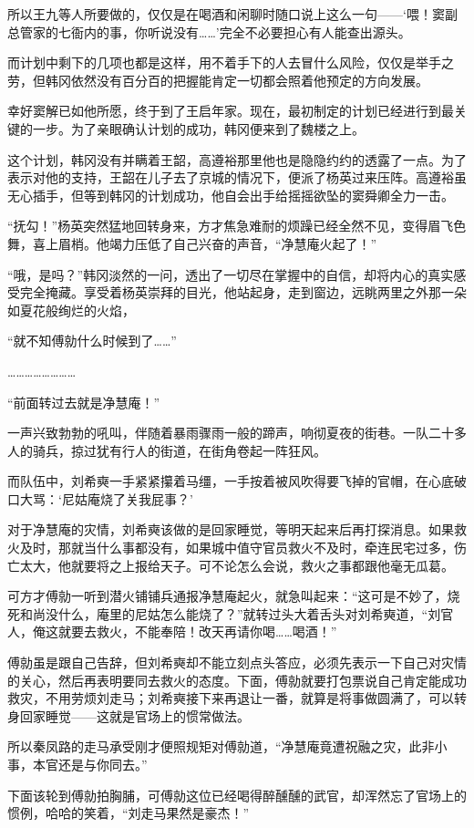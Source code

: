 所以王九等人所要做的，仅仅是在喝酒和闲聊时随口说上这么一句——‘喂！窦副总管家的七衙内的事，你听说没有……’完全不必要担心有人能查出源头。

而计划中剩下的几项也都是这样，用不着手下的人去冒什么风险，仅仅是举手之劳，但韩冈依然没有百分百的把握能肯定一切都会照着他预定的方向发展。

幸好窦解已如他所愿，终于到了王启年家。现在，最初制定的计划已经进行到最关键的一步。为了亲眼确认计划的成功，韩冈便来到了魏楼之上。

这个计划，韩冈没有并瞒着王韶，高遵裕那里他也是隐隐约约的透露了一点。为了表示对他的支持，王韶在儿子去了京城的情况下，便派了杨英过来压阵。高遵裕虽无心插手，但等到韩冈的计划成功，他自会出手给摇摇欲坠的窦舜卿全力一击。

“抚勾！”杨英突然猛地回转身来，方才焦急难耐的烦躁已经全然不见，变得眉飞色舞，喜上眉梢。他竭力压低了自己兴奋的声音，“净慧庵火起了！”

“哦，是吗？”韩冈淡然的一问，透出了一切尽在掌握中的自信，却将内心的真实感受完全掩藏。享受着杨英崇拜的目光，他站起身，走到窗边，远眺两里之外那一朵如夏花般绚烂的火焰，

“就不知傅勍什么时候到了……”

……………………

“前面转过去就是净慧庵！”

一声兴致勃勃的吼叫，伴随着暴雨骤雨一般的蹄声，响彻夏夜的街巷。一队二十多人的骑兵，掠过犹有行人的街道，在街角卷起一阵狂风。

而队伍中，刘希奭一手紧紧攥着马缰，一手按着被风吹得要飞掉的官帽，在心底破口大骂：‘尼姑庵烧了关我屁事？’

对于净慧庵的灾情，刘希奭该做的是回家睡觉，等明天起来后再打探消息。如果救火及时，那就当什么事都没有，如果城中值守官员救火不及时，牵连民宅过多，伤亡太大，他就要将之上报给天子。可不论怎么会说，救火之事都跟他毫无瓜葛。

可方才傅勍一听到潜火铺铺兵通报净慧庵起火，就急叫起来：“这可是不妙了，烧死和尚没什么，庵里的尼姑怎么能烧了？”就转过头大着舌头对刘希奭道，“刘官人，俺这就要去救火，不能奉陪！改天再请你喝……喝酒！”

傅勍虽是跟自己告辞，但刘希奭却不能立刻点头答应，必须先表示一下自己对灾情的关心，然后再表明要同去救火的态度。下面，傅勍就要打包票说自己肯定能成功救灾，不用劳烦刘走马；刘希奭接下来再退让一番，就算是将事做圆满了，可以转身回家睡觉——这就是官场上的惯常做法。

所以秦凤路的走马承受刚才便照规矩对傅勍道，“净慧庵竟遭祝融之灾，此非小事，本官还是与你同去。”

下面该轮到傅勍拍胸脯，可傅勍这位已经喝得醉醺醺的武官，却浑然忘了官场上的惯例，哈哈的笑着，“刘走马果然是豪杰！”


